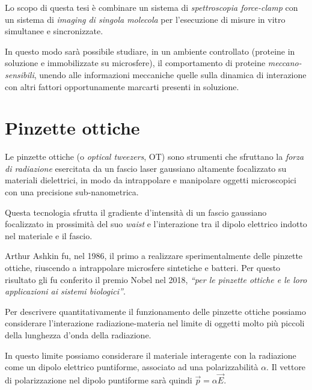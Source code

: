 Lo scopo di questa tesi è combinare un sistema di \emph{spettroscopia force-clamp} con un sistema di \emph{imaging di singola molecola} per l'esecuzione di misure in vitro simultanee e sincronizzate.

In questo modo sarà possibile studiare, in un ambiente
controllato (proteine in soluzione e immobilizzate su microsfere),
il comportamento di proteine \emph{meccano-sensibili}, unendo alle
informazioni meccaniche quelle sulla dinamica di interazione
con altri fattori opportunamente marcarti presenti in soluzione.










\section{Pinzette ottiche}
\label{sec:ot}


Le pinzette ottiche (o \textit{optical tweezers}, OT) sono strumenti che sfruttano la \emph{forza di radiazione} esercitata da un fascio laser gaussiano altamente focalizzato su materiali dielettrici, in modo da intrappolare e manipolare oggetti microscopici con una precisione sub-nanometrica.

Questa tecnologia sfrutta il gradiente d'intensità di un fascio gaussiano focalizzato in prossimità del suo \textit{waist} e l'interazione tra il dipolo elettrico indotto nel materiale e il fascio.

Arthur Ashkin fu, nel 1986, il primo a realizzare sperimentalmente delle pinzette ottiche, riuscendo a intrappolare microsfere sintetiche e batteri\cite{Ashkin:86}. Per questo risultato gli fu conferito il premio Nobel nel 2018, \emph{``per le pinzette ottiche e le loro applicazioni ai sistemi biologici''}.

Per descrivere quantitativamente il funzionamento delle pinzette ottiche possiamo considerare l'interazione radiazione-materia nel limite di oggetti molto più piccoli della lunghezza d'onda della radiazione.

In questo limite possiamo considerare il materiale interagente con la radiazione come un dipolo elettrico puntiforme, associato ad una polarizzabilità $\alpha$. Il vettore di polarizzazione nel dipolo puntiforme sarà quindi $\vec{p} = \alpha \vec{E}$.

